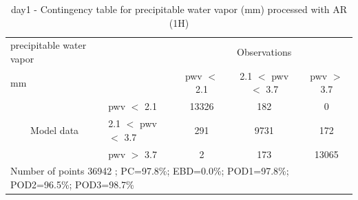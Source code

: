 \begin{table}[p!]
\begin{center}
\begin{tabular}{llccc}
\hline
{precipitable water vapor}                                       &                                                    & \multicolumn{3}{c}{Observations}                 \\
{mm}                                       &                             & pwv $<$ 2.1   & 2.1 $<$ pwv $<$ 3.7 & pwv $>$ 3.7 \\
\hline
\multicolumn{1}{c}{\multirow{3}{*}{Model data}}  & pwv $<$ 2.1             & 13326                & 182                       & 0              \\
                                                 & 2.1  $<$ pwv $<$ 3.7 & 291                & 9731                       & 172              \\
                                                 & pwv $>$ 3.7             & 2                & 173                       & 13065              \\
\hline 
\multicolumn{5}{l}{ Number of points        36942 ; PC=97.8\%; EBD=0.0\%; POD1=97.8\%; POD2=96.5\%; POD3=98.7\%}
\end{tabular}
\end{center}
\caption{day1 - Contingency table for  precipitable water vapor (mm) processed with AR (1H)  }
\label{tab:contingencypwvAFT:day1}
\end{table}

